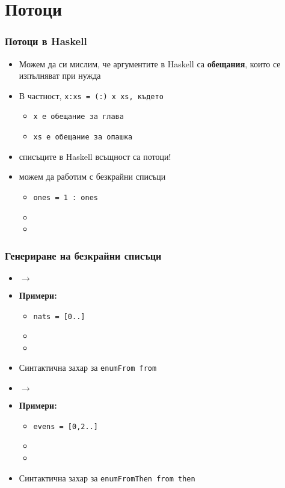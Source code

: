 \documentclass{beamer}
\begin{document}
\section{Потоци}

\begin{frame}
  \frametitle{Потоци в Haskell}

  \begin{itemize}[<+->]
  \item Можем да си мислим, че аргументите в Haskell са \textbf{обещания}, които се изпълняват при нужда
  \item В частност, \tt{x:xs = (:) x xs}, където
    \begin{itemize}
    \item \tt x е обещание за глава
    \item \tt{xs} е обещание за опашка
    \end{itemize}
  \item \alert{списъците в Haskell всъщност са потоци!}
  \item можем да работим с безкрайни списъци
    \begin{itemize}
    \item \tt{ones = 1 : ones}
    \item {}
    \item {}
    \end{itemize}
  \end{itemize}
\end{frame}

\begin{frame}
  \frametitle{Генериране на безкрайни списъци}

  \begin{itemize}
  \item {} $\rightarrow$ 
  \item \textbf{Примери:}
    \begin{itemize}
    \item \tt{nats = [0..]}
    \item {}
    \item {}
    \end{itemize}
  \item Синтактична захар за \tt{enumFrom from}
    \pause
  \item {} $\rightarrow$ 
  \item \textbf{Примери:}
    \begin{itemize}
    \item \tt{evens = [0,2..]}
    \item {}
    \item {}
    \end{itemize}
  \item Синтактична захар за \tt{enumFromThen from then}
  \end{itemize}
\end{frame}
\end{document}
